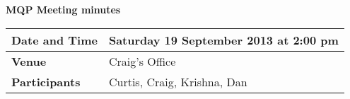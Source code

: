 \documentclass[a4wide,10pt]{extarticle}
\begin{document}
\thispagestyle{empty}

\begin{center}
\textbf{MQP Meeting minutes}
\vspace{0.33cm}
\end{center}

\begin{center}
\begin{tabular}{| m{2.8cm} | m{13.6cm} |} \hline
\textbf{Date and Time} & Saturday 19 September 2013 at 2:00 pm \\ \hline
\textbf{Venue} & Craig's Office \\ \hline
\textbf{Participants} & Curtis, Craig, Krishna, Dan\\ \hline
\end{tabular}
\end{center}
\end{document}
